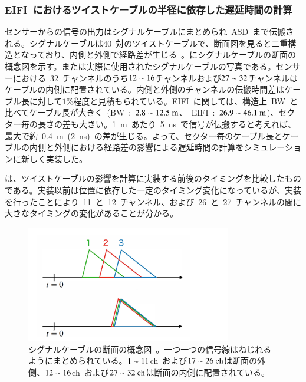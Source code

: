 \subsubsection{EIFI~におけるツイストケーブルの半径に依存した遅延時間の計算}
センサーからの信号の出力はシグナルケーブルにまとめられ~ASD~まで伝搬される。シグナルケーブルは40~対のツイストケーブルで、断面図を見ると二重構造となっており、内側と外側で経路差が生じる~\cite{MT:04}。にシグナルケーブルの断面の概念図を示す。または実際に使用されたシグナルケーブルの写真である。センサーにおける~32~チャンネルのうち$\rm{12\sim16}$チャンネルおよび$\rm{27\sim32}$チャンネルはケーブルの内側に配置されている。内側と外側のチャンネルの伝搬時間差はケーブル長に対して$1\%$程度と見積もられている。EIFI~に関しては、構造上~BW~と比べてケーブル長が大きく~(BW~:~$\rm{2.8\sim12.5~m}$、~EIFI~:~$\rm{26.9\sim46.1~m}$)、セクター毎の長さの差も大きい。1~m~あたり~5~ns~で信号が伝搬すると考えれば、最大で約~0.4~m~(2~ns)~の差が生じる。よって、セクター毎のケーブル長とケーブルの内側と外側における経路差の影響による遅延時間の計算をシミュレーションに新しく実装した。

は、ツイストケーブルの影響を計算に実装する前後のタイミングを比較したものである。実装以前は位置に依存した一定のタイミング変化になっているが、実装を行ったことにより~11~と~12~チャンネル、および~26~と~27~チャンネルの間に大きなタイミングの変化があることが分かる。

\begin{figure}[H]
    \centering   
    \includegraphics[width=0.8\textwidth,page=6]{img/slide/slide.pdf}
    \caption[シグナルケーブルの断面の概念図]{シグナルケーブルの断面の概念図~\cite{MT:04}。一つ一つの信号線はねじれるようにまとめられている。$\rm{1\sim11}$ch~および$\rm{17\sim26~ch}$は断面の外側、$\rm{12\sim16}$ch~および$\rm{27\sim32~ch}$は断面の内側に配置されている。}
    \label{fig:twist0}
\end{figure}

